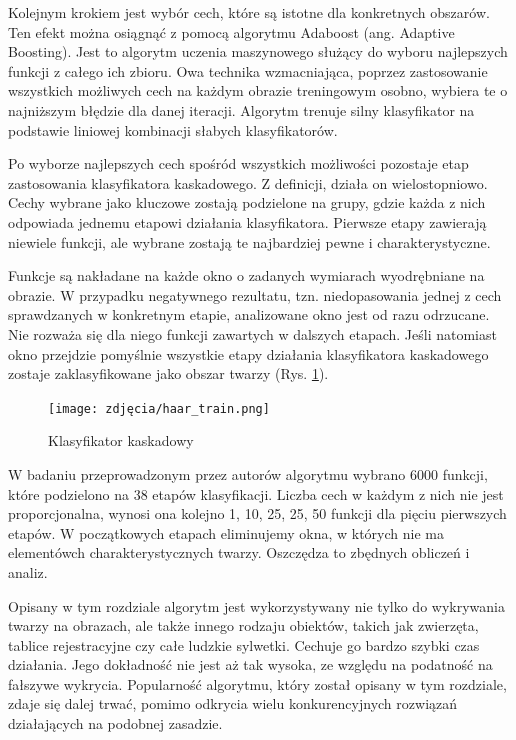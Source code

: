 Kolejnym krokiem jest wybór cech, które są istotne dla konkretnych obszarów. Ten efekt można osiągnąć z pomocą algorytmu Adaboost (ang. Adaptive Boosting). Jest to  algorytm uczenia maszynowego służący do wyboru najlepszych funkcji z całego ich zbioru. Owa technika wzmacniająca, poprzez zastosowanie wszystkich możliwych cech na każdym obrazie treningowym osobno, wybiera te o najniższym błędzie dla danej iteracji. Algorytm trenuje silny klasyfikator na podstawie liniowej kombinacji słabych klasyfikatorów.
 
Po wyborze najlepszych cech spośród wszystkich możliwości pozostaje etap zastosowania klasyfikatora kaskadowego. Z definicji, działa on wielostopniowo. Cechy wybrane jako kluczowe zostają podzielone na grupy, gdzie każda z nich odpowiada jednemu etapowi działania klasyfikatora. Pierwsze etapy zawierają niewiele funkcji, ale wybrane zostają te najbardziej pewne i charakterystyczne. 
 
Funkcje są nakładane na każde okno o zadanych wymiarach wyodrębniane na obrazie. W przypadku negatywnego rezultatu, tzn. niedopasowania jednej z cech sprawdzanych w konkretnym etapie, analizowane okno jest od razu odrzucane. Nie rozważa się dla niego funkcji zawartych w dalszych etapach. Jeśli natomiast okno przejdzie pomyślnie wszystkie etapy działania klasyfikatora kaskadowego zostaje zaklasyfikowane jako obszar twarzy (Rys. \ref{fig:cascadeClasificator}).  
 
\begin{figure}[h]
	\centering
	\texttt{[image: zdjęcia/haar\_train.png]}
	\caption{Klasyfikator kaskadowy \cite{haarCascade}} 
	\label{fig:cascadeClasificator}
\end{figure}

W badaniu przeprowadzonym przez autorów algorytmu wybrano 6000 funkcji, które podzielono na 38 etapów klasyfikacji. Liczba cech w każdym z nich nie jest proporcjonalna, wynosi ona kolejno 1, 10, 25, 25, 50 funkcji dla pięciu pierwszych etapów. W początkowych etapach eliminujemy okna, w których nie ma elementówch charakterystycznych twarzy. Oszczędza to zbędnych obliczeń i analiz.

Opisany w tym rozdziale algorytm jest wykorzystywany nie tylko do wykrywania twarzy na obrazach, ale także innego rodzaju obiektów, takich jak zwierzęta, tablice rejestracyjne czy całe ludzkie sylwetki. Cechuje go bardzo szybki czas działania. Jego dokładność nie jest aż tak wysoka, ze względu na podatność na fałszywe wykrycia.  Popularność algorytmu, który został opisany w tym rozdziale, zdaje się dalej trwać, pomimo odkrycia wielu konkurencyjnych rozwiązań działających na podobnej zasadzie. 

